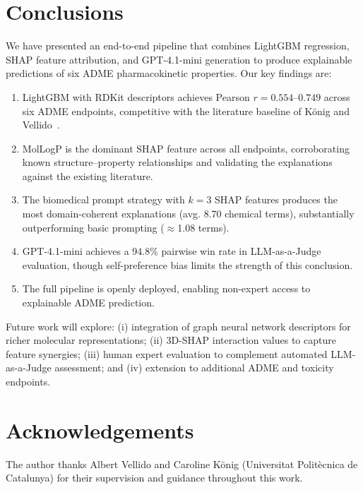 \documentclass[a4paper, 11pt]{article}
\begin{document}
\section{Conclusions}
\label{sec:conclusions}

We have presented an end-to-end pipeline that combines LightGBM
regression, SHAP feature attribution, and GPT-4.1-mini generation to
produce explainable predictions of six ADME pharmacokinetic properties.
Our key findings are:

\begin{enumerate}
  \item LightGBM with RDKit descriptors achieves Pearson $r = 0.554$--$0.749$
        across six ADME endpoints, competitive with the literature baseline
        of König and Vellido~\cite{konig2024adme}.
  \item MolLogP is the dominant SHAP feature across all endpoints,
        corroborating known structure–property relationships and validating
        the explanations against the existing literature.
  \item The biomedical prompt strategy with $k=3$ SHAP features produces
        the most domain-coherent explanations (avg. 8.70 chemical terms),
        substantially outperforming basic prompting ($\approx$1.08 terms).
  \item GPT-4.1-mini achieves a 94.8\% pairwise win rate in LLM-as-a-Judge
        evaluation, though self-preference bias limits the strength of
        this conclusion.
  \item The full pipeline is openly deployed, enabling non-expert access
        to explainable ADME prediction.
\end{enumerate}

Future work will explore: (i) integration of graph neural network
descriptors for richer molecular representations; (ii) 3D-SHAP
interaction values to capture feature synergies; (iii) human expert
evaluation to complement automated LLM-as-a-Judge assessment; and
(iv) extension to additional ADME and toxicity endpoints.


\section*{Acknowledgements}

The author thanks Albert Vellido and Caroline König (Universitat
Politècnica de Catalunya) for their supervision and guidance throughout
this work. %





\end{document}
